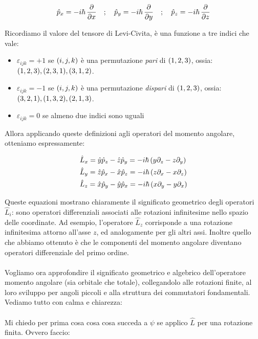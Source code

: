 \begin{align*}
	\hat{p}_x = - i \hbar \, \pdv{x} \quad ; \quad \hat{p}_y = - i \hbar \, \pdv{y} \quad ; \quad \hat{p}_z = - i \hbar \, \pdv{z} 
\end{align*}
	
	Ricordiamo il valore del tensore di Levi-Civita, è una funzione a tre indici che vale:
	
\begin{itemize}
	\item $\varepsilon_{ijk} = + 1$ se $\qty(i, j, k)$ è una permutazione \textit{pari} di $\qty(1, 2, 3)$, ossia: $\qty(1, 2, 3), \qty(2, 3, 1), \qty(3, 1, 2)$.
	\item $\varepsilon_{ijk} = -1$ se $\qty(i, j, k)$ è una permutazione \textit{dispari} di $\qty(1, 2, 3)$, ossia: $\qty(3, 2, 1), \qty(1, 3, 2), \qty(2, 1, 3)$.
	\item $\varepsilon_{ijk} = 0$ se almeno due indici sono uguali
\end{itemize}

	Allora applicando queste definizioni agli operatori del momento angolare, otteniamo espressamente:
	
\begin{align*}
	& \hat{L}_x = \hat{y}\hat{p}_z - \hat{z}\hat{p}_y = - i \hbar \, \qty( y\partial_z  - z \partial_y ) \\
	& \hat{L}_y = \hat{z}\hat{p}_x - \hat{x}\hat{p}_z = - i \hbar \, \qty( z\partial_x  - x \partial_z ) \\
	& \hat{L}_z = \hat{x}\hat{p}_y - \hat{y}\hat{p}_x = - i \hbar \, \qty( x\partial_y  - y \partial_x )
\end{align*}

	Queste equazioni mostrano chiaramente il significato geometrico degli operatori $\hat{L}_i$: sono operatori differenziali associati alle rotazioni infinitesime nello spazio delle coordinate. Ad esempio, l'operatore $\hat{L}_z$ corrisponde a una rotazione infinitesima attorno all'asse $z$, ed analogamente per gli altri assi. Inoltre quello che abbiamo ottenuto è che le componenti del momento angolare diventano operatori differenziale del primo ordine. 
	\\
	\\
	Vogliamo ora approfondire il significato geometrico e algebrico dell'operatore momento angolare (sia orbitale che totale), collegandolo alle rotazioni finite, al loro sviluppo per angoli piccoli e alla struttura dei commutatori fondamentali. Vediamo tutto con calma e chiarezza:
	\\
	\\
	Mi chiedo per prima cosa cosa cosa succeda a $\psi$ se applico $\hat{L}$ per una rotazione finita. Ovvero faccio:
	
